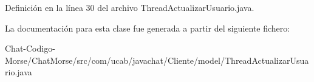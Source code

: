 Definición en la línea 30 del archivo Thread\-Actualizar\-Usuario.\-java.



La documentación para esta clase fue generada a partir del siguiente fichero\-:\begin{DoxyCompactItemize}
\item 
Chat-\/\-Codigo-\/\-Morse/\-Chat\-Morse/src/com/ucab/javachat/\-Cliente/model/Thread\-Actualizar\-Usuario.\-java\end{DoxyCompactItemize}
